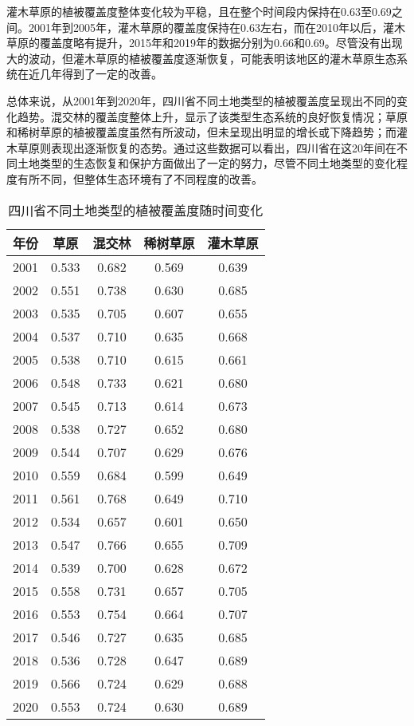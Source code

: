 \documentclass{article}
\begin{document}
		灌木草原的植被覆盖度整体变化较为平稳，且在整个时间段内保持在0.63至0.69之间。2001年到2005年，灌木草原的覆盖度保持在0.63左右，而在2010年以后，灌木草原的覆盖度略有提升，2015年和2019年的数据分别为0.66和0.69。尽管没有出现大的波动，但灌木草原的植被覆盖度逐渐恢复，可能表明该地区的灌木草原生态系统在近几年得到了一定的改善。
		
		总体来说，从2001年到2020年，四川省不同土地类型的植被覆盖度呈现出不同的变化趋势。混交林的覆盖度整体上升，显示了该类型生态系统的良好恢复情况；草原和稀树草原的植被覆盖度虽然有所波动，但未呈现出明显的增长或下降趋势；而灌木草原则表现出逐渐恢复的态势。通过这些数据可以看出，四川省在这20年间在不同土地类型的生态恢复和保护方面做出了一定的努力，尽管不同土地类型的变化程度有所不同，但整体生态环境有了不同程度的改善。
			\begin{table}[H]
				\centering
				\begin{tabular}{|c|c|c|c|c|}
					\hline
					\textbf{年份} & \textbf{草原} & \textbf{混交林} & \textbf{稀树草原} & \textbf{灌木草原} \\
					\hline
					2001 & 0.533 & 0.682 & 0.569 & 0.639 \\
					2002 & 0.551 & 0.738 & 0.630 & 0.685 \\
					2003 & 0.535 & 0.705 & 0.607 & 0.655 \\
					2004 & 0.537 & 0.710 & 0.635 & 0.668 \\
					2005 & 0.538 & 0.710 & 0.615 & 0.661 \\
					2006 & 0.548 & 0.733 & 0.621 & 0.680 \\
					2007 & 0.545 & 0.713 & 0.614 & 0.673 \\
					2008 & 0.538 & 0.727 & 0.652 & 0.680 \\
					2009 & 0.544 & 0.707 & 0.629 & 0.676 \\
					2010 & 0.559 & 0.684 & 0.599 & 0.649 \\
					2011 & 0.561 & 0.768 & 0.649 & 0.710 \\
					2012 & 0.534 & 0.657 & 0.601 & 0.650 \\
					2013 & 0.547 & 0.766 & 0.655 & 0.709 \\
					2014 & 0.539 & 0.700 & 0.628 & 0.672 \\
					2015 & 0.558 & 0.731 & 0.657 & 0.705 \\
					2016 & 0.553 & 0.754 & 0.664 & 0.707 \\
					2017 & 0.546 & 0.727 & 0.635 & 0.685 \\
					2018 & 0.536 & 0.728 & 0.647 & 0.689 \\
					2019 & 0.566 & 0.724 & 0.629 & 0.688 \\
					2020 & 0.553 & 0.724 & 0.630 & 0.689 \\
					\hline
				\end{tabular}
				\caption{四川省不同土地类型的植被覆盖度随时间变化}
			\end{table}
\end{document}
